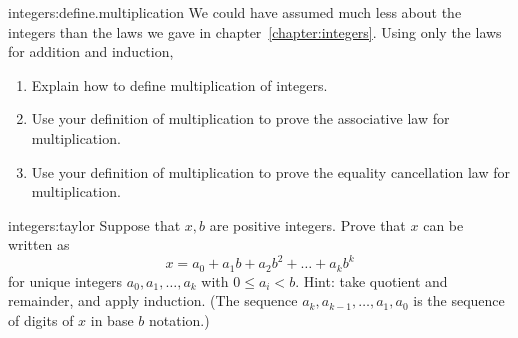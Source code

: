 \begin{problem}{integers:define.multiplication}
We could have assumed much less about the integers than the laws we gave in chapter~\ref{chapter:integers}.
Using only the laws for addition and induction,
\begin{enumerate}
\item Explain how to define multiplication of integers.
\item Use your definition of multiplication to prove the associative law for multiplication.  
\item Use your definition of multiplication to prove the equality cancellation law for multiplication. 
\end{enumerate}
\end{problem}
\begin{problem}{integers:taylor}
Suppose that \(x,b\) are positive integers.
Prove that \(x\) can be written as
\[
x = a_0 + a_1 b + a_2 b^2 + \dots + a_k b^k
\]
for unique integers \(a_0, a_1, \dots, a_k\) with \(0 \le a_i < b\).
Hint: take quotient and remainder, and apply induction.
(The sequence \(a_k,a_{k-1},\dots,a_1,a_0\) is the sequence of digits of \(x\) in base \(b\) notation.)
\end{problem}

